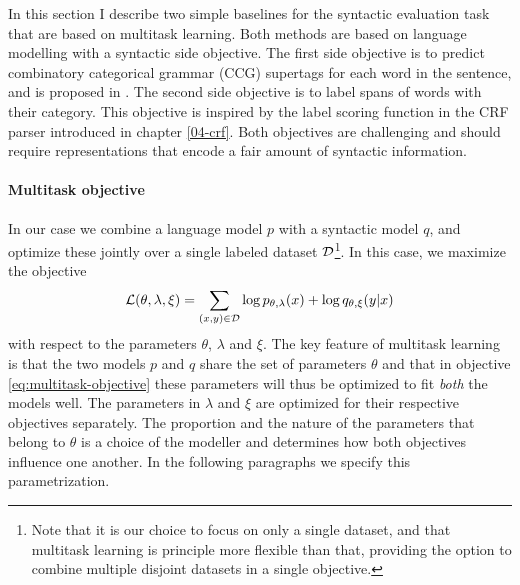 In this section I describe two simple baselines for the syntactic evaluation task that are based on multitask learning. Both methods are based on language modelling with a syntactic side objective. The first side objective is to predict combinatory categorical grammar (CCG) supertags \citep{bangalore1999supertagging} for each word in the sentence, and is proposed in \citep{enguehard2017multitask}. The second side objective is to label spans of words with their category. This objective is inspired by the label scoring function in the CRF parser introduced in chapter \ref{04-crf}. Both objectives are challenging and should require representations that encode a fair amount of syntactic information.

\paragraph{Multitask objective}
In our case we combine a language model $p$ with a syntactic model $q$, and optimize these jointly over a single labeled dataset $\mathcal{D}$\footnote{Note that it is our choice to focus on only a single dataset, and that multitask learning is principle more flexible than that, providing the option to combine multiple disjoint datasets in a single objective.}. In this case, we maximize the objective
\begin{equation}
  \label{eq:multitask-objective}
  \mathcal{L}(\theta, \lambda, \xi) = \sum_{ (x, y) \in \mathcal{D} }\log p_{\theta, \lambda}(x) + \log q_{\theta,\xi}(y | x)
\end{equation}
with respect to the parameters $\theta$, $\lambda$ and $\xi$. The key feature of multitask learning is that the two models $p$ and $q$ share the set of parameters $\theta$ and that in objective \ref{eq:multitask-objective} these parameters will thus be optimized to fit \textit{both} the models well. The parameters in $\lambda$ and $\xi$ are optimized for their respective objectives separately. The proportion and the nature of the parameters that belong to $\theta$ is a choice of the modeller and determines how both objectives influence one another. In the following paragraphs we specify this parametrization.

